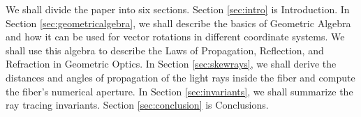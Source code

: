 \documentclass[a4paper,twocolumn,superscriptaddress]{revtex4-1}
\begin{document}


We shall divide the paper into six sections. 
Section \ref{sec:intro} is Introduction. 
In Section \ref{sec:geometricalgebra}, we shall describe the basics of Geometric Algebra and how it can be used for vector rotations in different coordinate systems. 
We shall use this algebra to describe the Laws of Propagation, Reflection, and Refraction in Geometric Optics. 
In Section \ref{sec:skewrays}, we shall derive the distances and angles of propagation of the light rays inside the fiber and compute the fiber's numerical aperture. 
In Section \ref{sec:invariants}, we shall summarize the ray tracing invariants. 
Section \ref{sec:conclusion} is Conclusions.
\end{document}
